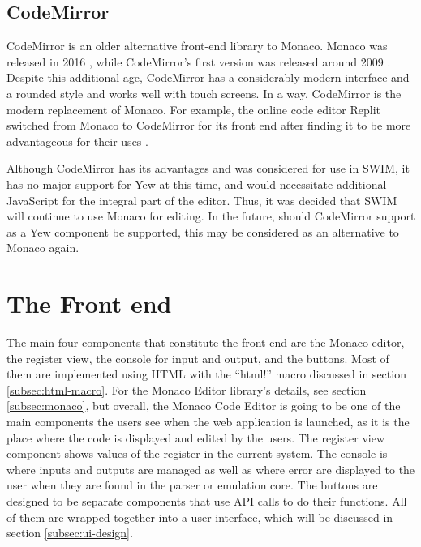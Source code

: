 \documentclass[
    paper=letter,
    parskip=half,
    fontsize=12pt,
    titlepage=firstiscover,
    toc=bibliography,
    numbers=endperiod
]{scrartcl}
\let\oldsection\section
\renewcommand{\section}{\newpage\oldsection}
\begin{document}
\subsection{CodeMirror}

CodeMirror is an older alternative front-end library to Monaco. Monaco
was released in 2016 \cite{monaco-changelog}, while CodeMirror's first version was released
around 2009 \cite{codemirror-changelog}. Despite this additional age,
CodeMirror has a considerably modern interface and a rounded style and
works well with touch screens. In a way, CodeMirror is the modern
replacement of Monaco. For example, the online code editor Replit
switched from Monaco to CodeMirror for its front end after finding it to
be more advantageous for their uses \cite{replit-code-editors}.

Although CodeMirror has its advantages and was considered for use in
SWIM, it has no major support for Yew at this time, and would
necessitate additional JavaScript for the integral part of the editor.
Thus, it was decided that SWIM will continue to use Monaco for editing.
In the future, should CodeMirror support as a Yew component be
supported, this may be considered as an alternative to Monaco again.


\section{The Front end}

The main four components that constitute the front end are the Monaco
editor, the register view, the console for input and output, and the buttons.
Most of them are implemented using HTML with the ``html!'' macro
discussed in section \ref{subsec:html-macro}. For the Monaco Editor library's details,
see section \ref{subsec:monaco}, but overall, the Monaco Code Editor is going to be one
of the main components the users see when the web application is launched, as it
is the place where the code is displayed and edited by the users. The
register view component shows values of the register in the current
system. The console is where inputs and outputs are managed as well as
where error are displayed to the user when they are found in the parser or emulation core. The buttons are
designed to be separate components that use API calls to do their
functions. All of them are wrapped together into a user interface, which
will be discussed in section \ref{subsec:ui-design}.
\end{document}
